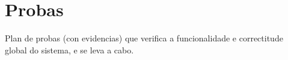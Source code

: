 \chapter{Probas}

Plan de probas (con evidencias) que verifica a funcionalidade e correctitude global do sistema, e se leva a cabo.